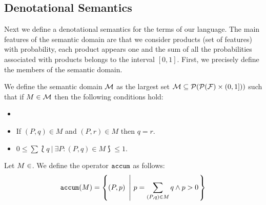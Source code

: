 \subsection{Denotational Semantics}
\label{sec:stat:den}

Next we define a denotational semantics for the terms of our language. The main features of the semantic domain are that we consider products (set of features) with probability,
each product appears one and the sum of all the probabilities associated with products belongs to the interval $[0,1]$. First, we precisely define the members of the semantic domain.



\bdfn\label{def:den:pr}
We define the semantic domain ${\cal M}$ as the largest set ${\cal M}\subseteq{\cal P}({\cal P}({\cal F})\times
  (0,1]))$ such that if $M\in{\cal M}$ then the following
  conditions hold:
  \begin{itemize}
  \item {}
  \item If $(P,q)\in M$ and $(P,r)\in M$ then $q=r$.
  \item $0\leq \sum \lbag q \ | \ \exists P: (P,q)\in M\rbag \leq 1$.
  \end{itemize}


Let $M \in \cal$. 
We define the operator $\mathtt{accum}$ as follows:
  $$\accum(M) = \left\{(P,p)\ \left| \ p=\sum_{(P,q)\in M}q \wedge p>0\right. \right\}$$
\edfn


